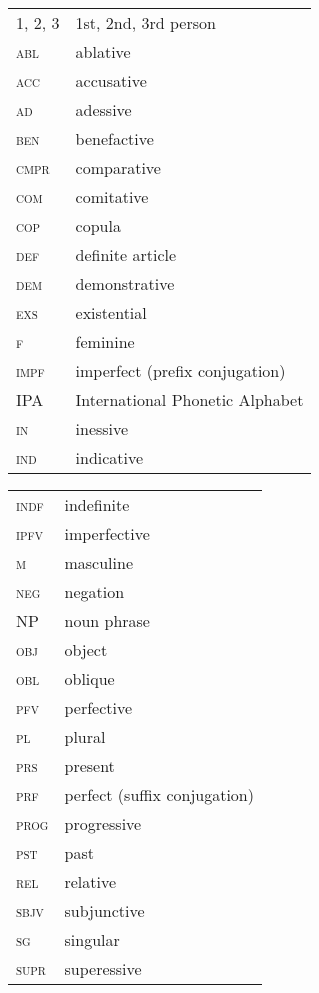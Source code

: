 \documentclass[output=paper]{langsci/langscibook}
\begin{document}
\begin{tabularx}{.5\textwidth}{@{}lQ@{}}
\textsc{1, 2, 3} & 1st, 2nd, 3rd person \\
\textsc{abl} & ablative \\
\textsc{acc} & accusative \\
\textsc{ad} & adessive \\
\textsc{ben} & benefactive \\
\textsc{cmpr} & comparative \\
\textsc{com} & comitative \\
\textsc{cop} & copula \\
\textsc{def} & definite article \\
\textsc{dem} & demonstrative \\
\textsc{exs} & existential \\
\textsc{f} & feminine \\
\textsc{impf} & imperfect (prefix conjugation) \\
IPA & International Phonetic Alphabet\\
\textsc{in} & inessive \\
\textsc{ind} & indicative \\
\end{tabularx}%
\begin{tabularx}{.5\textwidth}{@{}lQ@{}}
\textsc{indf} & indefinite \\
\textsc{ipfv} & imperfective \\
\textsc{m} & masculine \\
\textsc{neg} & negation \\
NP & noun phrase \\
\textsc{obj} & object \\
\textsc{obl} & oblique \\
\textsc{pfv} & perfective \\
\textsc{pl} & plural \\
\textsc{prs} & present \\
\textsc{prf} & perfect (suffix conjugation) \\
\textsc{prog} & progressive \\
\textsc{pst} & past \\
\textsc{rel} & relative \\
\textsc{sbjv} & subjunctive \\
\textsc{sg} & singular \\
\textsc{supr} & superessive \\
\end{tabularx}%


\sloppy\printbibliography[heading=subbibliography,notkeyword=this]
\end{document}
